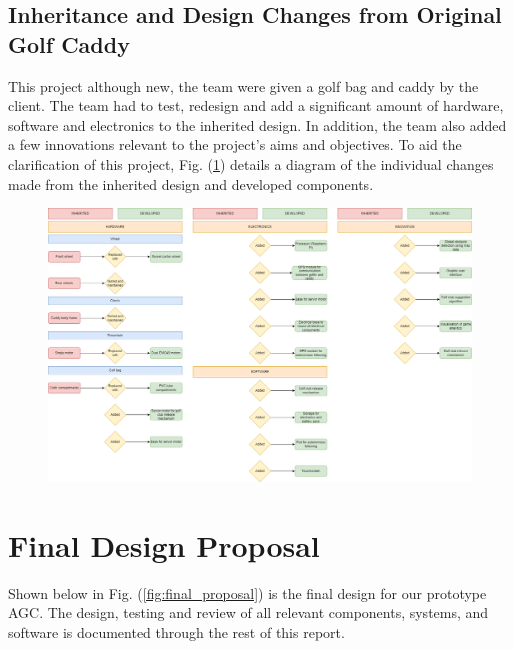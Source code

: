 \documentclass[11pt,landscape]{article}
\begin{document}
\begin{multicols}{3}
\subsection{Inheritance and Design Changes from Original Golf Caddy}
This project although new, the team were given a golf bag and caddy by the
client. The team had to test, redesign and add a significant amount of hardware,
software and electronics to the inherited design. In addition, the team also
added a few innovations relevant to the project’s aims and objectives. To aid
the clarification of this project, Fig. (\ref{fig:inheritance}) details a diagram of the
individual changes made from the inherited design and developed components. 
\end{multicols}
\newpage

\begin{figure}[H]
    \begin{center}
        \includegraphics[width=\textwidth]{inheritance.png}
    \end{center}
    \label{fig:inheritance}
\end{figure}


\newpage

\section{Final Design Proposal}
Shown below in Fig. (\ref{fig:final_proposal}) is the final design for our
prototype AGC. The design, testing and review of all relevant components, systems, and software is
documented through the rest of this report.
\end{document}
